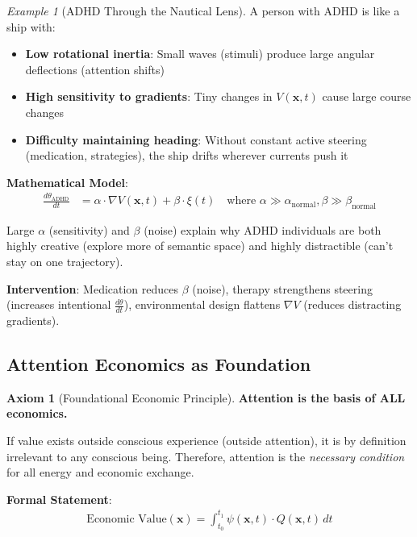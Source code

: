 \documentclass[11pt,a4paper]{article}
\theoremstyle{definition}
\newtheorem{axiom}{Axiom}[section]
\theoremstyle{remark}
\newtheorem{example}{Example}[section]
\begin{document}
\begin{small}
\begin{example}[ADHD Through the Nautical Lens]
A person with ADHD is like a ship with:
\begin{itemize}
    \item \textbf{Low rotational inertia}: Small waves (stimuli) produce large angular deflections (attention shifts)
    \item \textbf{High sensitivity to gradients}: Tiny changes in \(V(\mathbf{x},t)\) cause large course changes
    \item \textbf{Difficulty maintaining heading}: Without constant active steering (medication, strategies), the ship drifts wherever currents push it
\end{itemize}

\textbf{Mathematical Model}:
\begin{align}
\frac{d\theta_{\text{ADHD}}}{dt} &= \alpha \cdot \nabla V(\mathbf{x},t) + \beta \cdot \xi(t) \quad \text{where } \alpha \gg \alpha_{\text{normal}}, \beta \gg \beta_{\text{normal}}
\end{align}

Large \(\alpha\) (sensitivity) and \(\beta\) (noise) explain why ADHD individuals are both highly creative (explore more of semantic space) and highly distractible (can't stay on one trajectory).

\textbf{Intervention}: Medication reduces \(\beta\) (noise), therapy strengthens steering (increases intentional \(\frac{d\theta}{dt}\)), environmental design flattens \(\nabla V\) (reduces distracting gradients).
\end{example}

\subsection{Attention Economics as Foundation}

\begin{axiom}[Foundational Economic Principle]
\textbf{Attention is the basis of ALL economics.}

If value exists outside conscious experience (outside attention), it is by definition irrelevant to any conscious being. Therefore, attention is the \textit{necessary condition} for all energy and economic exchange.

\textbf{Formal Statement}:
\begin{align}
\text{Economic Value}(\mathbf{x}) = \int_{t_0}^{t_1} \psi(\mathbf{x}, t) \cdot Q(\mathbf{x}, t) \, dt
\end{align}


\end{axiom}
\end{small}
\end{document}
